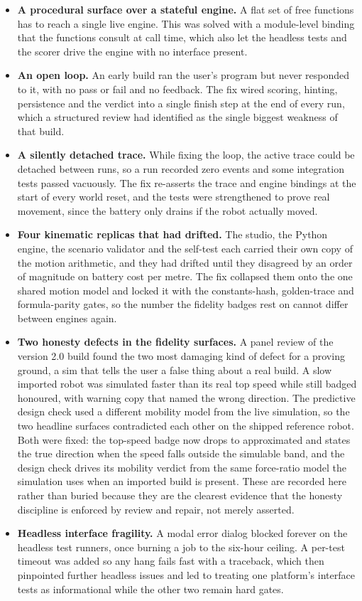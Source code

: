\documentclass[11pt,a4paper]{report}
\begin{document}
\begin{itemize}
\item \textbf{A procedural surface over a stateful engine.} A flat set of free functions has to reach a single live engine. This was solved with a module-level binding that the functions consult at call time, which also let the headless tests and the scorer drive the engine with no interface present.
\item \textbf{An open loop.} An early build ran the user's program but never responded to it, with no pass or fail and no feedback. The fix wired scoring, hinting, persistence and the verdict into a single finish step at the end of every run, which a structured review had identified as the single biggest weakness of that build.
\item \textbf{A silently detached trace.} While fixing the loop, the active trace could be detached between runs, so a run recorded zero events and some integration tests passed vacuously. The fix re-asserts the trace and engine bindings at the start of every world reset, and the tests were strengthened to prove real movement, since the battery only drains if the robot actually moved.
\item \textbf{Four kinematic replicas that had drifted.} The studio, the Python engine, the scenario validator and the self-test each carried their own copy of the motion arithmetic, and they had drifted until they disagreed by an order of magnitude on battery cost per metre. The fix collapsed them onto the one shared motion model and locked it with the constants-hash, golden-trace and formula-parity gates, so the number the fidelity badges rest on cannot differ between engines again.
\item \textbf{Two honesty defects in the fidelity surfaces.} A panel review of the version 2.0 build found the two most damaging kind of defect for a proving ground, a sim that tells the user a false thing about a real build. A slow imported robot was simulated faster than its real top speed while still badged honoured, with warning copy that named the wrong direction. The predictive design check used a different mobility model from the live simulation, so the two headline surfaces contradicted each other on the shipped reference robot. Both were fixed: the top-speed badge now drops to approximated and states the true direction when the speed falls outside the simulable band, and the design check drives its mobility verdict from the same force-ratio model the simulation uses when an imported build is present. These are recorded here rather than buried because they are the clearest evidence that the honesty discipline is enforced by review and repair, not merely asserted.
\item \textbf{Headless interface fragility.} A modal error dialog blocked forever on the headless test runners, once burning a job to the six-hour ceiling. A per-test timeout was added so any hang fails fast with a traceback, which then pinpointed further headless issues and led to treating one platform's interface tests as informational while the other two remain hard gates.
\end{itemize}
\end{document}

